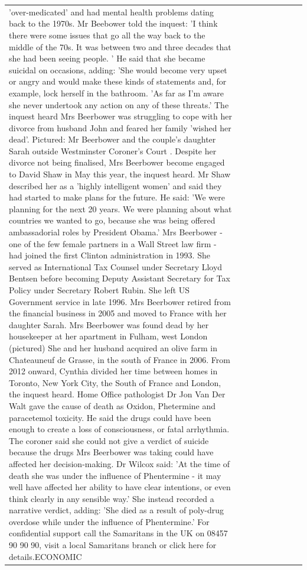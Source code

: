 \begin{table}[H]
\begin{tabular}{lllrlllll}
'over-medicated' and had mental health problems dating back to the 1970s. Mr Beebower told the inquest: 'I think there were some issues that go all the way back to the middle of the 70s. It was between two and three decades that she had been seeing people. ' He said that she became suicidal on occasions, adding: 'She would become very upset or angry and would make these kinds of statements and, for example, lock herself in the bathroom. 'As far as I'm aware she never undertook any action on any of these threats.' The inquest heard Mrs Beerbower was struggling to cope with her divorce from husband John and feared her family 'wished her dead'. Pictured: Mr Beerbower and the couple's daughter Sarah outside Westminster Coroner's Court . Despite her divorce not being finalised, Mrs Beerbower become engaged to David Shaw in May this year, the inquest heard. Mr Shaw described her as a 'highly intelligent women' and said they had started to make plans for the future. He said: 'We were planning for the next 20 years. We were planning about what countries we wanted to go, because she was being offered ambassadorial roles by President Obama.' Mrs Beerbower - one of the few female partners in a Wall Street law firm - had joined the first Clinton administration in 1993. She served as International Tax Counsel under Secretary Lloyd Bentsen before becoming Deputy Assistant Secretary for Tax Policy under Secretary Robert Rubin. She left US Government service in late 1996. Mrs Beerbower retired from the financial business in 2005 and moved to France with her daughter Sarah. Mrs Beerbower was found dead by her housekeeper at her apartment in Fulham, west London (pictured) She and her husband acquired an olive farm in Chateauneuf de Grasse, in the south of France in 2006. From 2012 onward, Cynthia divided her time between homes in Toronto, New York City, the South of France and London, the inquest heard. Home Office pathologist Dr Jon Van Der Walt gave the cause of death as Oxidon, Phetermine and paracetemol toxicity. He said the drugs could have been enough to create a loss of consciousness, or fatal arrhythmia. The coroner said she could not give a verdict of suicide because the drugs Mrs Beerbower was taking could have affected her decision-making. Dr Wilcox said: 'At the time of death she was under the influence of Phentermine - it may well have affected her ability to have clear intentions, or even think clearly in any sensible way.' She instead recorded a narrative verdict, adding: 'She died as a result of poly-drug overdose while under the influence of Phentermine.' For confidential support call the Samaritans in the UK on 08457 90 90 90, visit a local Samaritans branch or click here for details.ECONOMIC \\

\end{tabular}
\end{table}
